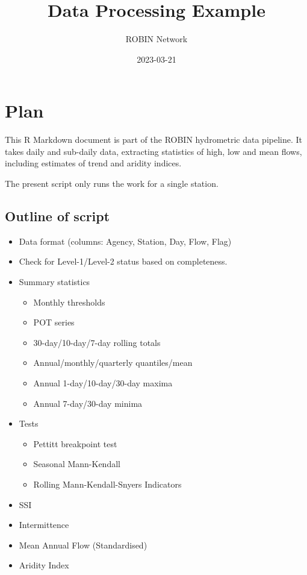 \documentclass[
]{article}
\title{Data Processing Example}
\author{ROBIN Network}
\date{2023-03-21}
\providecommand{\tightlist}{%
  \setlength{\itemsep}{0pt}\setlength{\parskip}{0pt}}
\begin{document}
\maketitle

\hypertarget{plan}{%
\section{Plan}\label{plan}}

This R Markdown document is part of the ROBIN hydrometric data pipeline.
It takes daily and sub-daily data, extracting statistics of high, low
and mean flows, including estimates of trend and aridity indices.

The present script only runs the work for a single station.

\hypertarget{outline-of-script}{%
\subsection{Outline of script}\label{outline-of-script}}

\begin{itemize}
\tightlist
\item
  Data format (columns: Agency, Station, Day, Flow, Flag)
\item
  Check for Level-1/Level-2 status based on completeness.
\item
  Summary statistics

  \begin{itemize}
  \tightlist
  \item
    Monthly thresholds
  \item
    POT series
  \item
    30-day/10-day/7-day rolling totals
  \item
    Annual/monthly/quarterly quantiles/mean
  \item
    Annual 1-day/10-day/30-day maxima
  \item
    Annual 7-day/30-day minima
  \end{itemize}
\item
  Tests

  \begin{itemize}
  \tightlist
  \item
    Pettitt breakpoint test
  \item
    Seasonal Mann-Kendall
  \item
    Rolling Mann-Kendall-Snyers Indicators
  \end{itemize}
\item
  SSI
\item
  Intermittence
\item
  Mean Annual Flow (Standardised)
\item
  Aridity Index
\end{itemize}
\end{document}
